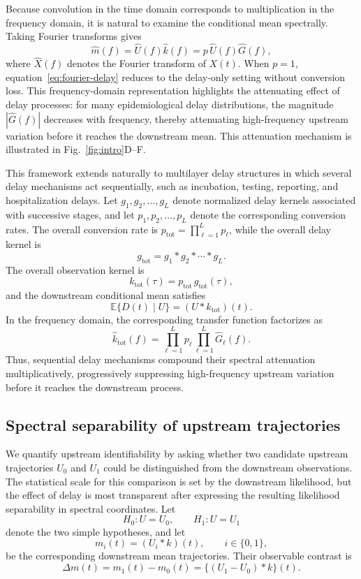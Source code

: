 Because convolution in the time domain corresponds to multiplication in the frequency domain, it is natural to examine the conditional mean spectrally. Taking Fourier transforms gives
\begin{equation}
\widehat m(f)
=
\widehat U(f)\widehat k(f)
=
p\,\widehat U(f)\widehat G(f),
\label{eq:fourier-delay}
\end{equation}
where \(\widehat X(f)\) denotes the Fourier transform of \(X(t)\). When \(p=1\), equation~\eqref{eq:fourier-delay} reduces to the delay-only setting without conversion loss. This frequency-domain representation highlights the attenuating effect of delay processes: for many epidemiological delay distributions, the magnitude \(|\widehat G(f)|\) decreases with frequency, thereby attenuating high-frequency upstream variation before it reaches the downstream mean. This attenuation mechanism is illustrated in Fig.~\ref{fig:intro}D--F.

This framework extends naturally to multilayer delay structures in which several delay mechanisms act sequentially, such as incubation, testing, reporting, and hospitalization delays. Let \(g_1,g_2,\ldots,g_L\) denote normalized delay kernels associated with successive stages, and let \(p_1,p_2,\ldots,p_L\) denote the corresponding conversion rates. The overall conversion rate is \(p_{\mathrm{tot}}=\prod_{\ell=1}^L p_\ell\), while the overall delay kernel is
\[
g_{\mathrm{tot}}=g_1*g_2*\cdots*g_L.
\]
The overall observation kernel is
\[
k_{\mathrm{tot}}(\tau)=p_{\mathrm{tot}}\,g_{\mathrm{tot}}(\tau),
\]
and the downstream conditional mean satisfies
\[
\mathbb E\{D(t)\mid U\}=(U*k_{\mathrm{tot}})(t).
\]
In the frequency domain, the corresponding transfer function factorizes as
\begin{equation}
\widehat k_{\mathrm{tot}}(f)
=
\prod_{\ell=1}^L p_\ell
\prod_{\ell=1}^L \widehat G_\ell(f).
\end{equation}
Thus, sequential delay mechanisms compound their spectral attenuation multiplicatively, progressively suppressing high-frequency upstream variation before it reaches the downstream process.

\subsection*{Spectral separability of upstream trajectories}

We quantify upstream identifiability by asking whether two candidate upstream trajectories \(U_0\) and \(U_1\) could be distinguished from the downstream observations. The statistical scale for this comparison is set by the downstream likelihood, but the effect of delay is most transparent after expressing the resulting likelihood separability in spectral coordinates. Let
\[
H_0: U=U_0,
\qquad
H_1: U=U_1
\]
denote the two simple hypotheses, and let
\[
m_i(t)=(U_i*k)(t),
\qquad i\in\{0,1\},
\]
be the corresponding downstream mean trajectories. Their observable contrast is
\[
\Delta m(t)=m_1(t)-m_0(t)=\{(U_1-U_0)*k\}(t).
\]

